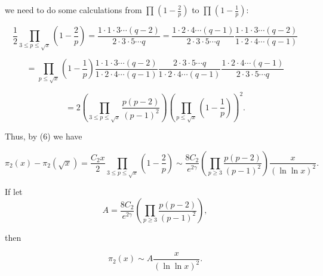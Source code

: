 \documentclass{aomart}
\begin{document}
 we need to do some calculations from \( \prod_{}^{}(1-\frac{2}{p} )\) { to }\( \prod_{}^{}(1-\frac{1}{p} )\):

\begin{equation}
\frac{1}{2} \prod_{3\leq p\leq\sqrt{x}}^{}(1-\frac{2}{p} ) = \frac{1\cdot 1\cdot 3\cdots (q-2)}{2\cdot 3\cdot 5\cdots q} = \frac{1\cdot 2\cdot 4\cdots (q-1)}{2\cdot 3\cdot 5\cdots q}\frac{1\cdot 1\cdot 3\cdots (q-2)}{1\cdot 2\cdot 4\cdots (q-1)} 
\end{equation}


\vspace{1\baselineskip}
\begin{equation}
  =  \prod_{p\leq\sqrt{x}}^{}(1-\frac{1}{p} )  \frac{1\cdot 1\cdot 3\cdots (q-2)}{1\cdot 2\cdot 4\cdots (q-1)}   \frac{2\cdot 3\cdot 5\cdots q}{1\cdot 2\cdot 4\cdots (q-1)} \frac{1\cdot 2\cdot 4\cdots (q-1)}{2\cdot 3\cdot 5\cdots q} 
\end{equation}


\begin{equation}
 = 2\left(\prod_{3\leq p\leq\sqrt{x}}^{}\frac{p(p-2)}{(p-1)^{2}}\right)\left(\prod_{p\leq\sqrt{x}}^{}(1-\frac{1}{p} )\right)^{2} .
\end{equation}

\vspace{1\baselineskip}

 Thus, by (6) we have

\begin{equation}
\pi_{2}\left(x\right)-\pi_{2}\left(\sqrt{x}\right)  = \frac{C_{2}x}{2} \prod_{3\leq p\leq\sqrt{x}}^{}\left(1-\frac{2}{p}\right) \sim \frac{8C_{2}}{e^{2\gamma }}\left(\prod_{p\geq 3}^{}\frac{p\left(p-2\right)}{\left(p-1\right)^{2}}\right)\frac{x}{(\ln \ln  x)^{2}} .
\end{equation}


\begin{center}
If let \textit{ \\ }\begin{equation}
A = \frac{8C_{2}}{e^{2\gamma }}\left(\prod_{p\geq 3}^{}\frac{p\left(p-2\right)}{\left(p-1\right)^{2}}\right)  ,
\end{equation}

\end{center}


then

\begin{equation}
                                                 \pi_{2}\left(x\right) \sim  A\frac{x}{(\ln \ln  x)^{2}} .                                                
\end{equation}
\end{document}
